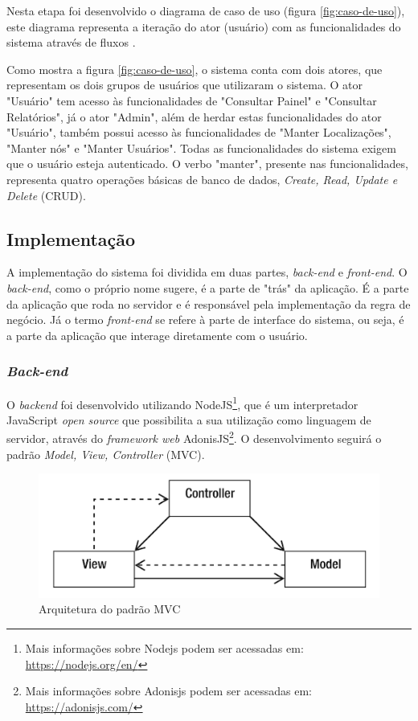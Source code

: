 Nesta etapa foi desenvolvido o diagrama de caso de uso (figura \ref{fig:caso-de-uso}), este diagrama representa a iteração do ator (usuário) com as funcionalidades do sistema através de fluxos \cite{gomes2003casodeuso}.

Como mostra a figura \ref{fig:caso-de-uso}, o sistema conta com dois atores, que representam os
dois grupos de usuários que utilizaram o sistema. O ator "Usuário" tem acesso às funcionalidades de "Consultar Painel" e "Consultar Relatórios", já o ator "Admin", além de herdar estas funcionalidades do ator "Usuário", também possui acesso às funcionalidades de "Manter Localizações", "Manter nós" e "Manter Usuários". Todas as funcionalidades do sistema exigem que o usuário esteja autenticado. O verbo "manter", presente nas funcionalidades, representa quatro operações básicas de banco de dados, \textit{Create, Read, Update e Delete} (CRUD).

\subsection{Implementação}
A implementação do sistema foi dividida em duas partes, \textit{back-end} e \textit{front-end}. O \textit{back-end}, como o próprio nome sugere, é a parte de "trás" da aplicação. É a parte da aplicação que roda no servidor e é responsável pela implementação da regra de negócio. Já o termo \textit{front-end} se refere à parte de interface do sistema, ou seja, é a parte da aplicação que interage diretamente com o usuário.

\subsubsection{\textit{Back-end}}
O \textit{backend} foi desenvolvido utilizando NodeJS\footnote{Mais informações sobre Nodejs podem ser acessadas em: \url{https://nodejs.org/en/}}, que é um interpretador JavaScript \textit{open source} que possibilita a sua utilização como linguagem de servidor, através do \textit{framework web} AdonisJS\footnote{Mais informações sobre Adonisjs podem ser acessadas em: \url{https://adonisjs.com/}}. O desenvolvimento seguirá o padrão \textit{Model, View, Controller} (MVC).

\begin{figure}[H]
    \centering
    \includegraphics[scale=1]{04-figuras/mvc.png}
    \caption{Arquitetura do padrão MVC}
    \vspace{-\baselineskip}
    \label{fig:mvc}
\end{figure}


